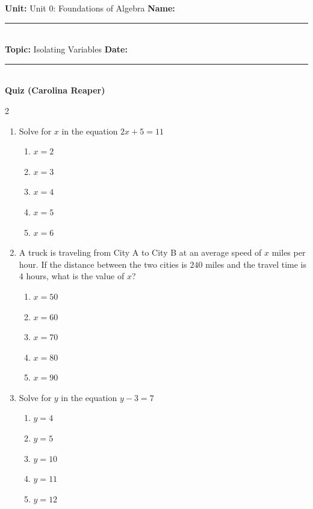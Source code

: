 \documentclass[10pt]{article}
\begin{document}
\enlargethispage{2.5cm}

\begin{tcolorbox}[colback=mainblue!5, colframe=mainblue, sharp corners, boxrule=0.5pt]
    \small \textbf{Unit:} Unit 0: Foundations of Algebra \hfill \textbf{Name:} \rule{3cm}{0.4pt} \\
    \small \textbf{Topic:} Isolating Variables \hfill \textbf{Date:} \rule{2cm}{0.4pt} \\
    \centering \textbf{\large Quiz (Carolina Reaper)}
\end{tcolorbox}

\vspace{0.2cm}

\begin{multicols}{2}
\begin{enumerate}[label=\textbf{Q\arabic*.}, leftmargin=*, itemsep=6pt, parsep=0pt]

  \item \small Solve for $x$ in the equation $2x + 5 = 11$
  \begin{enumerate}[label=(\Alph*), leftmargin=0.6cm, nosep, itemsep=2pt]
    \item $x = 2$
    \item $x = 3$
    \item $x = 4$
    \item $x = 5$
    \item $x = 6$
  \end{enumerate}

  \item \small A truck is traveling from City A to City B at an average speed of $x$ miles per hour. If the distance between the two cities is $240$ miles and the travel time is $4$ hours, what is the value of $x$?
  \begin{enumerate}[label=(\Alph*), leftmargin=0.6cm, nosep, itemsep=2pt]
    \item $x = 50$
    \item $x = 60$
    \item $x = 70$
    \item $x = 80$
    \item $x = 90$
  \end{enumerate}

  \item \small Solve for $y$ in the equation $y - 3 = 7$
  \begin{enumerate}[label=(\Alph*), leftmargin=0.6cm, nosep, itemsep=2pt]
    \item $y = 4$
    \item $y = 5$
    \item $y = 10$
    \item $y = 11$
    \item $y = 12$
  \end{enumerate}


\end{enumerate}
\end{multicols}
\end{document}
